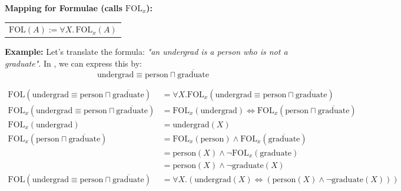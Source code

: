 \textbf{Mapping for Formulae (calls $\text{FOL}_x$):}
\begin{tabular}{@{}l@{}}
    $\text{FOL}(A) := \forall X. \, \text{FOL}_x(A)$ \\
\end{tabular}

\textbf{Example: }
Let's translate the formula: \textit{"an undergrad is a person who is not a graduate"}. In , we can express this by:
\[
\text{undergrad} \equiv \text{person} \sqcap \overline{\text{graduate}}
\]

\begin{align*}
\text{FOL}(\text{undergrad} \equiv \text{person} \sqcap \overline{\text{graduate}}) &= \forall X. \text{FOL}_x(\text{undergrad} \equiv \text{person} \sqcap \overline{\text{graduate}}) \\
\text{FOL}_x(\text{undergrad} \equiv \text{person} \sqcap \overline{\text{graduate}}) &= \text{FOL}_x(\text{undergrad}) \Leftrightarrow \text{FOL}_x(\text{person} \sqcap \overline{\text{graduate}}) \\
\text{FOL}_x(\text{undergrad}) &= \text{undergrad}(X) \\
\text{FOL}_x(\text{person} \sqcap \overline{\text{graduate}}) &= \text{FOL}_x(\text{person}) \land \text{FOL}_x(\overline{\text{graduate}}) \\
&= \text{person}(X) \land \neg \text{FOL}_x(\text{graduate}) \\
&= \text{person}(X) \land \neg \text{graduate}(X) \\
\text{FOL}(\text{undergrad} \equiv \text{person} \sqcap \overline{\text{graduate}}) &= \forall X. (\text{undergrad}(X) \Leftrightarrow (\text{person}(X) \land \neg \text{graduate}(X)))
\end{align*}


